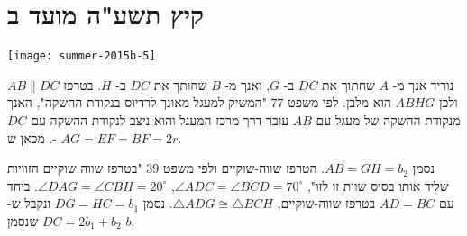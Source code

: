 

\np

\section{קיץ תשע"ה מועד ב}

\begin{center}
\texttt{[image: summer-2015b-5]}
\end{center}

%
%
%

נוריד אנך מ-%
$A$
שחתוך את
$DC$
ב-%
$G$,
ואנך מ-%
$B$
שחותך את 
$DC$
ב-%
$H$.
בטרפז
$AB\|DC$
ולכן
$ABHG$
הוא מלבן. לפי משפט
$77$
"המשיק למעגל מאונך לרדיוס בנקודת ההשקה", האנך מנקודת ההשקה של מעגל עם
$AB$
עובר דרך מרכז המעגל והוא ניצב לנקודת ההשקה עם
$DC$.
מכאן ש-%
$AG=EF=BF=2r$.

נסמן
$AB=GH=b_2$.
הטרפז שווה-שוקיים ולפי משפט
$39$
"בטרפז שווה שוקיים הזוויות שליד אותו בסיס שוות זו לזו",
$\angle ADC=\angle BCD=70^\circ$,
$\angle DAG=\angle CBH=20^\circ$.
ביחד עם 
$AD=BC$
בטרפז שווה-שוקיים,
$\triangle ADG \cong \triangle BCH$.
נסמן
$DG=HC=b_1$
ונקבל ש-%
$DC=2b_1+b_2$
שנסמן
$b$.

